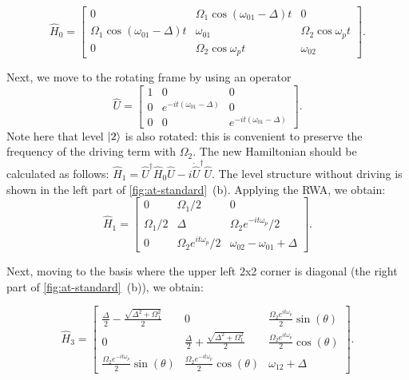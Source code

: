 \documentclass[%
 aip,
 amsmath,amssymb,
 reprint,%
]{revtex4-1}
\begin{document}
\begin{equation}
\hat H_0 = \left[\begin{matrix}
0 & \Omega_{1} \cos{\left(\omega_{01}- \Delta \right)t} & 0\\
\Omega_{1} \cos{\left(\omega_{01} - \Delta \right)t}   & \omega_{01} &\Omega_{2} \cos\omega_p t  \\
0 & \Omega_{2} \cos{\omega_p t}  & \omega_{02}\end{matrix}\right].
\end{equation}

Next, we move to the rotating frame by using an operator
\[
\hat U = \left[\begin{matrix} 
1 & 0 & 0\\0 & e^{- i t \left(\omega_{01}- \Delta\right)} & 0\\0 & 0 & e^{- i t \left(\omega_{01}- \Delta\right)}\end{matrix}\right].
\]
Note here that level $\ket{2}$ is also rotated: this is convenient to preserve the frequency of the driving term with $\Omega_2$. The new Hamiltonian should be calculated as follows: $\hat H_1 = \hat U^\dag \hat H_0 \hat U - i \dot{\hat{U}}^\dag \hat U$. The level structure without driving  is shown in the left part of \autoref{fig:at-standard}~(b). Applying the RWA, we obtain:
\begin{equation}
\hat H_1 = \left[\begin{matrix}0 &\Omega_{1}/2 & 0\\\Omega_{1}/2 & \Delta & \Omega_{2} e^{- i t \omega_p}/2\\0 & \Omega_{2} e^{i t \omega_p}/2 & \omega_{02} - \omega_{01}+\Delta \end{matrix}\right].
\end{equation}

Next, moving to the basis where the upper left 2x2 corner is diagonal (the right part of \autoref{fig:at-standard}~(b)), we obtain:

\begin{equation}
\hat H_3 = \left[\begin{matrix} 
\frac{\Delta}{2} - \frac{\sqrt{\Delta^{2} + \Omega_{1}^{2}}}{2} & 
0 &
\frac{\Omega_{2} e^{i t \omega_{p}}}{2}\sin(\theta)
\\
0 & 
\frac{\Delta}{2} + \frac{\sqrt{\Delta^{2} + \Omega_{1}^{2}}}{2} & 
\frac{\Omega_{2} e^ {i t \omega_p}}{2}\cos(\theta)
\\
\frac{\Omega_{2} e^{-i t \omega_{p}} }{2}\sin(\theta) & 
\frac{\Omega_{2} e^{-i t \omega_{p}}}{2} \cos(\theta) & 
\omega_{12} +\Delta 
\end{matrix}\right].
\end{equation}
\end{document}
